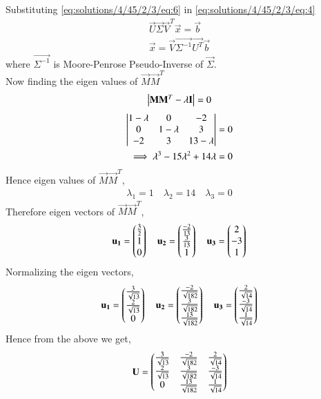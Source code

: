 Substituting \eqref{eq:solutions/4/45/2/3/eq:6} in \eqref{eq:solutions/4/45/2/3/eq:4}
\begin{align}
\vec{U}\vec{\Sigma}\vec{V}^T\vec{x} = \vec{b}\\
\vec{x} = \vec{V}\vec{\Sigma^{-1}}\vec{U^T}\vec{b}\label{eq:solutions/4/45/2/3/eq:8}
\end{align}
where $\vec{\Sigma^{-1}}$ is Moore-Penrose Pseudo-Inverse of $\vec{\Sigma}$.\\ Now finding the eigen values of $\vec{M}\vec{M}^T$
\begin{align}
\begin{vmatrix}\mathbf{M}\mathbf{M}^T - \lambda\mathbf{I}\end{vmatrix} = 0
\end{align}
\begin{align}
\begin{vmatrix}1-\lambda&0&-2\\0&1-\lambda&3\\-2&3&13-\lambda\end{vmatrix}=0\\
\implies \lambda^3-15\lambda^2+14\lambda=0
\end{align}
Hence eigen values of $\vec{M}\vec{M}^T$,
\begin{align}
\lambda_1 = 1 \quad \lambda_2 =14 \quad \lambda_3=0
\end{align}
Therefore eigen vectors of $\vec{M}\vec{M}^T$,
\begin{align}
\mathbf{u_1}=\begin{pmatrix}\frac{3}{2}\\1\\0\end{pmatrix} \quad
\mathbf{u_2}=\begin{pmatrix}\frac{-2}{13}\\\frac{3}{13}\\1\end{pmatrix} \quad
\mathbf{u_3}=\begin{pmatrix}2\\-3\\1\end{pmatrix}
\end{align}
Normalizing the eigen vectors,
\begin{align}
\mathbf{u_1}=\begin{pmatrix}\frac{3}{\sqrt{13}}\\\frac{2}{\sqrt{13}}\\0\end{pmatrix}\quad
\mathbf{u_2}=\begin{pmatrix}\frac{-2}{\sqrt{182}}\\\frac{3}{\sqrt{182}}\\\frac{13}{\sqrt{182}}\end{pmatrix}\quad
\mathbf{u_3}=\begin{pmatrix}\frac{2}{\sqrt{14}}\\\frac{-3}{\sqrt{14}}\\\frac{1}{\sqrt{14}}\end{pmatrix}
\end{align}
Hence from the above we get,
\begin{align}
\mathbf{U}=\begin{pmatrix}\frac{3}{\sqrt{13}}&\frac{-2}{\sqrt{182}}&\frac{2}{\sqrt{14}}\\\frac{2}{\sqrt{13}}&\frac{3}{\sqrt{182}}&\frac{-3}{\sqrt{14}}\\0&\frac{13}{\sqrt{182}}&\frac{1}{\sqrt{14}}\end{pmatrix}\label{eq:solutions/4/45/2/3/eq:9}
\end{align}
